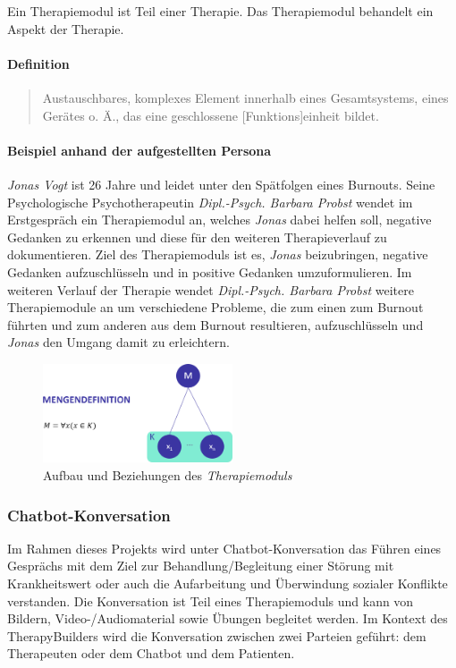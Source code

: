 Ein Therapiemodul ist Teil einer Therapie. Das Therapiemodul behandelt ein Aspekt der Therapie.

\paragraph{Definition}
\begin{quote}
Austauschbares, komplexes Element innerhalb eines Gesamtsystems, eines Gerätes o. Ä., das eine geschlossene [Funktions]einheit bildet. \cite{DudenMod70:online}
\end{quote}

\paragraph{Beispiel anhand der aufgestellten Persona}
 \emph{Jonas Vogt} ist 26 Jahre und leidet unter den Spätfolgen eines Burnouts. Seine Psychologische Psychotherapeutin \emph{Dipl.-Psych. Barbara Probst} wendet im Erstgespräch ein Therapiemodul an, welches \emph{Jonas} dabei helfen soll, negative Gedanken zu erkennen und diese für den weiteren Therapieverlauf zu dokumentieren. Ziel des Therapiemoduls ist es, \emph{Jonas} beizubringen, negative Gedanken aufzuschlüsseln und in positive Gedanken umzuformulieren. Im weiteren Verlauf der Therapie wendet \emph{Dipl.-Psych. Barbara Probst} weitere Therapiemodule an um verschiedene Probleme, die zum einen zum Burnout führten und zum anderen aus dem Burnout resultieren, aufzuschlüsseln und \emph{Jonas} den Umgang damit zu erleichtern.

\begin{figure}[h]
\centering
\includegraphics[width=0.5\textwidth]{pictures/moduldef}
\caption{Aufbau und Beziehungen des \emph{Therapiemoduls}}
\label{moduldef}
\end{figure}

\subsubsection{Chatbot-Konversation}
Im Rahmen dieses Projekts wird unter Chatbot-Konversation das Führen  eines Gesprächs mit dem Ziel zur Behandlung/Begleitung einer Störung mit Krankheitswert oder auch die Aufarbeitung und Überwindung sozialer Konflikte verstanden. Die Konversation ist Teil eines Therapiemoduls und kann von Bildern, Video-/Audiomaterial sowie Übungen begleitet werden. Im Kontext des TherapyBuilders wird die Konversation zwischen zwei Parteien geführt: dem Therapeuten oder dem Chatbot und dem Patienten.

